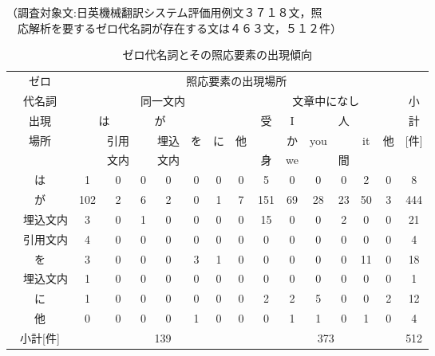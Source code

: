 \begin{table}[htbp]
  \begin{center}
    \caption{ゼロ代名詞とその照応要素の出現傾向}
   {\footnotesize 
（調査対象文:日英機械翻訳システム評価用例文３７１８文，照 \\
　応解析を要するゼロ代名詞が存在する文は４６３文，５１２件）} \\
    \vspace{2mm}
    \leavevmode
    \footnotesize
    \begin{tabular}{||c|c||c|c|c|c|c|c|c||c|c|c|c|c|c||c||} \hline \hline
      \multicolumn{2}{||c||}{ゼロ} & \multicolumn{13}{c||}{照応要素の出現場所} & \\ \cline{3-15}
      \multicolumn{2}{||c||}{代名詞} & \multicolumn{7}{c||}{同一文内} & \multicolumn{6}{c||}{文章中になし} & 小  \\ \cline{3-15}
      \multicolumn{2}{||c||}{出現} & \multicolumn{2}{c|}{は} & \multicolumn{2}{c|}{が} & & & & 受 & I & & 人 & & & 計 \\ \cline{4-4} \cline{6-6}
      \multicolumn{2}{||c||}{場所} & & 引用 & & 埋込 & を & に & 他 & & か & you & & it &  他 & [件] \\  
      \multicolumn{2}{||c||}{}     & & 文内 & & 文内 &    &    &    & 身 & we &     & 間 & &     & \\  \hline \hline
      \multicolumn{2}{||c||}{は} & 1   & 0 & 0 & 0 & 0 & 0 & 0 & 5   & 0  & 0  & 0  & 2  & 0 & 8   \\ \hline
      \multicolumn{2}{||c||}{が} & 102 & 2 & 6 & 2 & 0 & 1 & 7 & 151 & 69 & 28 & 23 & 50 & 3 & 444 \\ \cline{2-16}
       & 埋込文内                      & 3   & 0 & 1 & 0 & 0 & 0 & 0 & 15  & 0  & 0  & 2  & 0  & 0 & 21  \\ \cline{2-16}
       & 引用文内                      & 4   & 0 & 0 & 0 & 0 & 0 & 0 & 0   & 0  & 0  & 0  & 0  & 0 & 4   \\ \hline
      \multicolumn{2}{||c||}{を} & 3   & 0 & 0 & 0 & 3 & 1 & 0 & 0   & 0  & 0  & 0  & 11 & 0 & 18  \\ \cline{2-16}
       & 埋込文内                      & 1   & 0 & 0 & 0 & 0 & 0 & 0 & 0   & 0  & 0  & 0  & 0  & 0 & 1   \\ \hline
      \multicolumn{2}{||c||}{に} & 1   & 0 & 0 & 0 & 0 & 0 & 0 & 2   & 2  & 5  & 0  & 0  & 2 & 12  \\ \hline
      \multicolumn{2}{||c||}{他}     & 0   & 0 & 0 & 0 & 1 & 0 & 0 & 0   & 1  & 1  & 0  & 1  & 0 & 4 \\ \hline \hline
      \multicolumn{2}{||c||}{小計[件]} & \multicolumn{7}{c||}{139} & \multicolumn{6}{c||}{373} & 512 \\ \hline \hline 
    \end{tabular} \\ 
  \end{center}
  \label{tab:dist}
\end{table}

